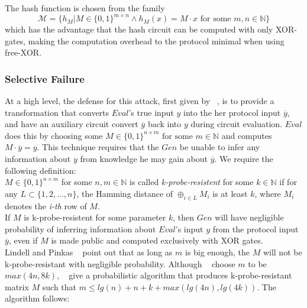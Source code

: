 \documentclass{article}
\begin{document}
The hash function is chosen from the family $$\mathcal{M} = \{ h_{M} | M \in \{0,1\}^{m \times n} \wedge h_{M}(x) = M \cdot x \text{ for some } m,n \in \mathbb{N} \}$$
which has the advantage that the hash circuit can be computed with only XOR-gates, making the computation overhead to the protocol minimal when using free-XOR.

\subsubsection{Selective Failure} \label{sec:selective-failure-defense}

At a high level, the defense for this attack, first given by ~\cite{LP07}, is to provide a transformation that converts $Eval$'s true input $y$ into the her protocol input $\overline{y}$, and have an auxiliary circuit convert $\overline{y}$ back into $y$ during circuit evaluation. $Eval$ does this by choosing some $M \in \{0,1\}^{n \times m} \text{ for some } m \in \mathbb{N}$ and computes $M \cdot \overline{y} = y$. This technique requires that the $Gen$ be unable to infer any information about $y$ from knowledge he may gain about $\overline{y}$.  We require the following definition:\\

$M \in \{0,1\}^{n \times m}$ for some $n,m \in \mathbb{N}$  is called \emph{k-probe-resistent} for some $k \in \mathbb{N}$ if for any $L \subset \{1,2,...,n\}$, the Hamming distance of $\oplus_{i \in L} M_{i} $ is at least $k$, where $M_{i}$ denotes the \emph{i-th} row of $M$.\\

If $M$ is k-probe-resistent for some parameter $k$, then $Gen$ will have negligible probability of inferring information about $Eval$'s input $y$ from the protocol input $\overline{y}$, even if $M$ is made public and computed exclusively with XOR gates. \\

Lindell and Pinkas ~\cite{LP07} point out that as long as $m$ is big enough, the $M$ will not be k-probe-resistant with negligible probability. Although ~\cite{LP07} choose $m$ to be $max(4n,8k)$, ~\cite{fast2pc} give a probabilistic algorithm that produces k-probe-resistant matrix $M$ such that $m \leq lg(n) + n + k + max(lg(4n),lg(4k))$. The algorithm follows:
\end{document}
